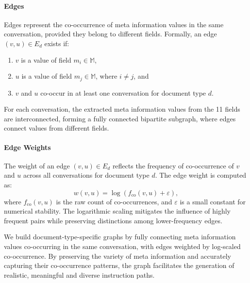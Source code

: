 \paragraph{Edges}
Edges represent the co-occurrence of meta information values in the same conversation, provided they belong to different fields.
Formally, an edge $(v, u) \in E_d$ exists if:
\begin{enumerate}
    \item $v$ is a value of field $m_i \in \mathbb{M}$,
    \item $u$ is a value of field $m_j \in \mathbb{M}$, where $i \neq j$, and  
    \item $v$ and $u$ co-occur in at least one conversation for document type $d$.
\end{enumerate}
For each conversation, the extracted meta information values from the 11 fields are interconnected, forming a fully connected bipartite subgraph, where edges connect values from different fields.

\paragraph{Edge Weights}
The weight of an edge $(v, u) \in E_d$ reflects the frequency of co-occurrence of $v$ and $u$ across all conversations for document type $d$. The edge weight is computed as:
\[
w(v, u) = \log(f_{\text{co}}(v, u) + \varepsilon),
\]
where $f_{\text{co}}(v, u)$ is the raw count of co-occurrences, and $\varepsilon$ is a small constant for numerical stability. The logarithmic scaling mitigates the influence of highly frequent pairs while preserving distinctions among lower-frequency edges.

We build document-type-specific graphs by fully connecting meta information values co-occurring in the same conversation, with edges weighted by log-scaled co-occurrence. 
By preserving the variety of meta information and accurately capturing their co-occurrence patterns, the graph facilitates the generation of realistic, meaningful and diverse instruction paths.


